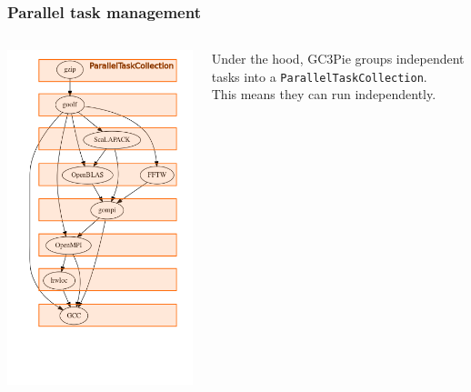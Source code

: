 \documentclass[english,serif,mathserif,xcolor=pdftex,dvipsnames,table]{beamer}
\begin{document}
\begin{frame}[fragile]
  \frametitle{Parallel task management}
  \begin{columns}
    \begin{column}{0.4\linewidth}
      \includegraphics[height=1.00\textheight]{fig/gzip2.png}
    \end{column}
    \begin{column}{0.6\linewidth}
      \begin{flushright}
        Under the hood, GC3Pie groups independent tasks into a
        \texttt{ParallelTaskCollection}.
        \\ \+
        This means they can run independently.
      \end{flushright}
    \end{column}
  \end{columns}
\end{frame}
\end{document}
